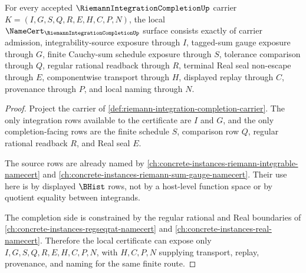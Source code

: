 \begin{theorem}
\label{thm:riemann-integration-completion-namecert-obligations}
For every accepted $\RiemannIntegrationCompletionUp$ carrier $K=(I,G,S,Q,R,E,H,C,P,N)$, the local $\NameCert_{\RiemannIntegrationCompletionUp}$ surface consists exactly of carrier admission, integrability-source exposure through $I$, tagged-sum gauge exposure through $G$, finite Cauchy-sum schedule exposure through $S$, tolerance comparison through $Q$, regular rational readback through $R$, terminal Real seal non-escape through $E$, componentwise transport through $H$, displayed replay through $C$, provenance through $P$, and local naming through $N$.
\end{theorem}
\begin{proof}
Project the carrier of \autoref{def:riemann-integration-completion-carrier}. The only integration rows available to the certificate are $I$ and $G$, and the only completion-facing rows are the finite schedule $S$, comparison row $Q$, regular rational readback $R$, and Real seal $E$.

The source rows are already named by \autoref{ch:concrete-instances-riemann-integrable-namecert} and \autoref{ch:concrete-instances-riemann-sum-gauge-namecert}. Their use here is by displayed $\BHist$ rows, not by a host-level function space or by quotient equality between integrands.

The completion side is constrained by the regular rational and Real boundaries of \autoref{ch:concrete-instances-regseqrat-namecert} and \autoref{ch:concrete-instances-real-namecert}. Therefore the local certificate can expose only $I,G,S,Q,R,E,H,C,P,N$, with $H,C,P,N$ supplying transport, replay, provenance, and naming for the same finite route.
\end{proof}

